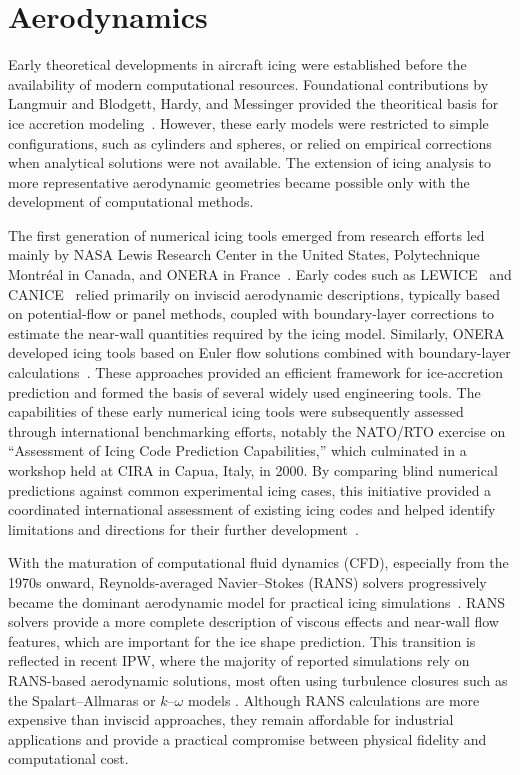 \section{Aerodynamics}\label{sec:review_flow_solvers}

Early theoretical developments in aircraft icing were established before the availability of modern computational resources. Foundational contributions by Langmuir and Blodgett, Hardy, and Messinger provided the theoritical basis for ice accretion modeling~\cite{gent2000aircraft}. However, these early models were restricted to simple configurations, such as cylinders and spheres, or relied on empirical corrections when analytical solutions were not available. The extension of icing analysis to more representative aerodynamic geometries became possible only with the development of computational methods.

The first generation of numerical icing tools emerged from research efforts led mainly by NASA Lewis Research Center in the United States,  Polytechnique Montréal in Canada, and ONERA in France~\cite{gent2000aircraft}. Early codes such as LEWICE~\cite{wright2008user} and CANICE~\cite{saeed2001modified} relied primarily on inviscid aerodynamic descriptions, typically based on potential-flow or panel methods, coupled with boundary-layer corrections to estimate the near-wall quantities required by the icing model. Similarly, ONERA developed icing tools based on Euler flow solutions combined with boundary-layer calculations~\cite{ONICE}. These approaches provided an efficient framework for ice-accretion prediction and formed the basis of several widely used engineering tools. The capabilities of these early numerical icing tools were subsequently assessed through international benchmarking efforts, notably the NATO/RTO exercise on ``Assessment of Icing Code Prediction Capabilities,'' which culminated in a workshop held at CIRA in Capua, Italy, in 2000. By comparing blind numerical predictions against common experimental icing cases, this initiative provided a coordinated international assessment of existing icing codes and helped identify limitations and directions for their further development~\cite{NATO_RTO_2001}.

With the maturation of computational fluid dynamics (CFD), especially from the 1970s onward, Reynolds-averaged Navier--Stokes (RANS) solvers progressively became the dominant aerodynamic model for practical icing simulations~\cite{ransPushIcing}. RANS solvers provide a more complete description of viscous effects and near-wall flow features, which are important for the ice shape prediction. This transition is reflected in recent IPW, where the majority of reported simulations rely on RANS-based aerodynamic solutions, most often using turbulence closures such as the Spalart–Allmaras or $k$–$\omega$ models \cite{spallartAllmaras, kOmegaMenter}. Although RANS calculations are more expensive than inviscid approaches, they remain affordable for industrial applications and provide a practical compromise between physical fidelity and computational cost.

